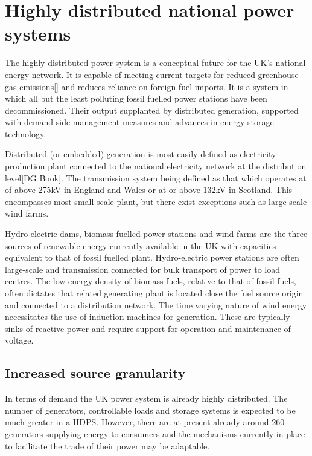 \section{Highly distributed national power systems}
The highly distributed power system is a conceptual future for the UK's
national energy network.  It is capable of meeting current targets for reduced
greenhouse gas emissions[] and reduces reliance on foreign fuel imports.  It
is a system in which all but the least polluting fossil fuelled power stations
have been decommissioned.  Their output supplanted by distributed generation,
supported with demand-side management measures and advances in energy storage
technology.

Distributed (or embedded) generation is most easily defined as electricity
production plant connected to the national electricity network at the
distribution level[DG Book].  The transmission system being defined as that
which operates at of above 275kV in England and Wales or at or above 132kV in
Scotland.  This encompasses most small-scale plant, but there exist exceptions
such as large-scale wind farms.

Hydro-electric dams, biomass fuelled power stations and wind farms are the
three sources of renewable energy currently available in the UK with
capacities equivalent to that of fossil fuelled plant.  Hydro-electric power
stations are often large-scale and transmission connected for bulk transport
of power to load centres.  The low energy density of biomass fuels, relative
to that of fossil fuels, often dictates that related generating plant is
located close the fuel source origin and connected to a distribution network.
The time varying nature of wind energy necessitates the use of induction
machines for generation.  These are typically sinks of reactive power and
require support for operation and maintenance of voltage.

\subsection{Increased source granularity}
In terms of demand the UK power system is already highly distributed.  The
number of generators, controllable loads and storage systems is expected to be
much greater in a HDPS.  However, there are at present already around 260
generators supplying energy to consumers and the mechanisms currently in place
to facilitate the trade of their power may be adaptable.

